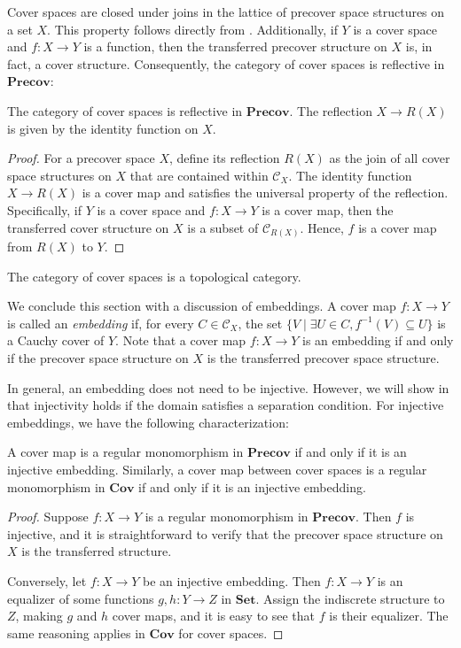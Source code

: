 \documentclass[reqno]{amsart}
\theoremstyle{definition}
\theoremstyle{remark}
\numberwithin{figure}{section}
\newcommand{\cat}[1]{\mathbf{#1}}
\begin{document}
Cover spaces are closed under joins in the lattice of precover space structures on a set $X$.
This property follows directly from .
Additionally, if $Y$ is a cover space and $f : X \to Y$ is a function, then the transferred precover structure on $X$ is, in fact, a cover structure.
Consequently, the category of cover spaces is reflective in $\cat{Precov}$:

\begin{prop}
The category of cover spaces is reflective in $\cat{Precov}$.
The reflection $X \to R(X)$ is given by the identity function on $X$.
\end{prop}
\begin{proof}
For a precover space $X$, define its reflection $R(X)$ as the join of all cover space structures on $X$ that are contained within $\mathcal{C}_X$.
The identity function $X \to R(X)$ is a cover map and satisfies the universal property of the reflection.
Specifically, if $Y$ is a cover space and $f : X \to Y$ is a cover map, then the transferred cover structure on $X$ is a subset of $\mathcal{C}_{R(X)}$.
Hence, $f$ is a cover map from $R(X)$ to $Y$.
\end{proof}

\begin{cor}
The category of cover spaces is a topological category.
\end{cor}

We conclude this section with a discussion of embeddings.  
A cover map $f : X \to Y$ is called an \emph{embedding} if, for every $C \in \mathcal{C}_X$,
the set $\{ V \mid \exists U \in C, f^{-1}(V) \subseteq U \}$ is a Cauchy cover of $Y$.
Note that a cover map $f : X \to Y$ is an embedding if and only if the precover space structure on $X$ is the transferred precover space structure.

In general, an embedding does not need to be injective.
However, we will show in  that injectivity holds if the domain satisfies a separation condition.
For injective embeddings, we have the following characterization:

\begin{prop}
A cover map is a regular monomorphism in $\cat{Precov}$ if and only if it is an injective embedding.
Similarly, a cover map between cover spaces is a regular monomorphism in $\cat{Cov}$ if and only if it is an injective embedding.
\end{prop}
\begin{proof}
Suppose $f : X \to Y$ is a regular monomorphism in $\cat{Precov}$.
Then $f$ is injective, and it is straightforward to verify that the precover space structure on $X$ is the transferred structure.  

Conversely, let $f : X \to Y$ be an injective embedding.
Then $f : X \to Y$ is an equalizer of some functions $g,h : Y \to Z$ in $\cat{Set}$.
Assign the indiscrete structure to $Z$, making $g$ and $h$ cover maps, and it is easy to see that $f$ is their equalizer.
The same reasoning applies in $\cat{Cov}$ for cover spaces.  
\end{proof}
\end{document}
